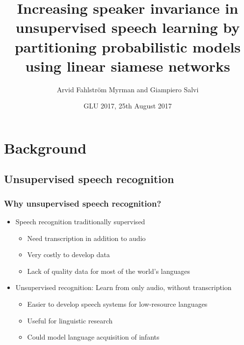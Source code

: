 \documentclass[british]{beamer}
\title[Unsupervised learning with linear siamese networks]{Increasing speaker invariance in unsupervised speech learning by partitioning probabilistic models using linear siamese networks}
\author{Arvid Fahlström Myrman and Giampiero Salvi}
\institute[KTH]{KTH Royal Institute of Technology}
\date{GLU 2017, 25th August 2017}
\begin{document}
  
  \begin{frame}
   \titlepage
  \end{frame}
  
  \section{Background}
  \subsection{Unsupervised speech recognition}
  
  \begin{frame}
    \frametitle{Why unsupervised speech recognition?}
    
    \begin{itemize}
     \item Speech recognition traditionally supervised
     \begin{itemize}
      \item Need transcription in addition to audio
      \item Very costly to develop data
      \item Lack of quality data for most of the world's languages
     \end{itemize} \pause
     \item Unsupervised recognition: Learn from only audio, without transcription
     \begin{itemize}
       \item Easier to develop speech systems for low-resource languages
       \item Useful for linguistic research
       \item Could model language acquisition of infants
     \end{itemize}
    \end{itemize}
    

  \end{frame}
  
\end{document}
